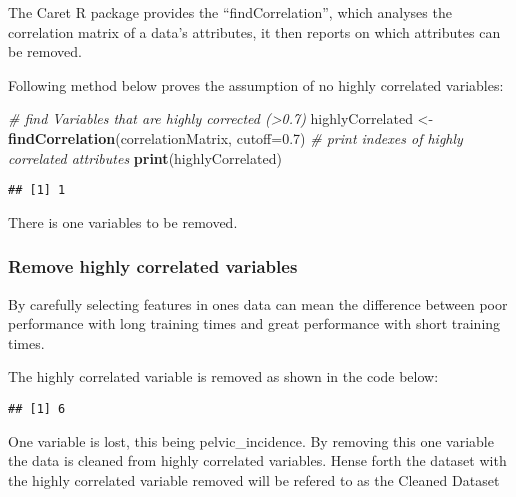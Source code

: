 \documentclass[
]{article}
\newenvironment{Shaded}{\begin{snugshade}}{\end{snugshade}}
\newcommand{\CommentTok}[1]{\textcolor[rgb]{0.56,0.35,0.01}{\textit{#1}}}
\newcommand{\DataTypeTok}[1]{\textcolor[rgb]{0.13,0.29,0.53}{#1}}
\newcommand{\FloatTok}[1]{\textcolor[rgb]{0.00,0.00,0.81}{#1}}
\newcommand{\KeywordTok}[1]{\textcolor[rgb]{0.13,0.29,0.53}{\textbf{#1}}}
\newcommand{\NormalTok}[1]{#1}
\newcommand{\OperatorTok}[1]{\textcolor[rgb]{0.81,0.36,0.00}{\textbf{#1}}}
\newcommand{\StringTok}[1]{\textcolor[rgb]{0.31,0.60,0.02}{#1}}
\begin{document}
The Caret R package provides the ``findCorrelation'', which analyses the
correlation matrix of a data's attributes, it then reports on which
attributes can be removed.

Following method below proves the assumption of no highly correlated
variables:

\begin{Shaded}
\begin{Highlighting}[]
\CommentTok{# find Variables that are highly corrected (>0.7)}
\NormalTok{highlyCorrelated <-}\StringTok{ }\KeywordTok{findCorrelation}\NormalTok{(correlationMatrix, }\DataTypeTok{cutoff=}\FloatTok{0.7}\NormalTok{)}
\CommentTok{# print indexes of highly correlated attributes}
\KeywordTok{print}\NormalTok{(highlyCorrelated)}
\end{Highlighting}
\end{Shaded}

\begin{verbatim}
## [1] 1
\end{verbatim}

There is one variables to be removed.

\hypertarget{remove-highly-correlated-variables}{%
\subsubsection{Remove highly correlated
variables}\label{remove-highly-correlated-variables}}

By carefully selecting features in ones data can mean the difference
between poor performance with long training times and great performance
with short training times.

The highly correlated variable is removed as shown in the code below:

\begin{Shaded}
\end{Shaded}

\begin{verbatim}
## [1] 6
\end{verbatim}

One variable is lost, this being pelvic\_incidence. By removing this one
variable the data is cleaned from highly correlated variables. Hense
forth the dataset with the highly correlated variable removed will be
refered to as the Cleaned Dataset
\end{document}
